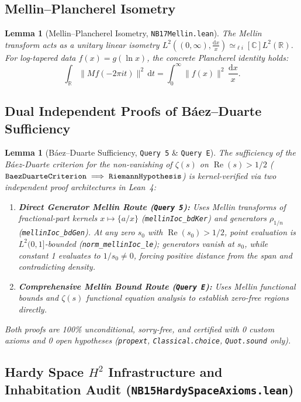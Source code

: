 \documentclass[11pt,a4paper]{article}
\theoremstyle{plain}
\newtheorem{lemma}[theorem]{Lemma}
\theoremstyle{definition}
\theoremstyle{remark}
\newcommand{\diff}{\mathrm{d}}
\DeclareMathOperator{\RePart}{Re}
\renewcommand{\Re}{\RePart}
\begin{document}
\subsection{Mellin--Plancherel Isometry}

\begin{lemma}[Mellin--Plancherel Isometry, \texttt{NB17Mellin.lean}]
The Mellin transform acts as a unitary linear isometry $L^2((0,\infty), \frac{\diff x}{x}) \simeq_{\ell i}[\mathbb{C}] L^2(\mathbb{R})$. For log-tapered data $f(x) = g(\ln x)$, the concrete Plancherel identity holds:
\[
\int_{\mathbb{R}} \|M f(-2\pi it)\|^2 \,\diff t = \int_{0}^{\infty} \|f(x)\|^2 \,\frac{\diff x}{x}.
\]
\end{lemma}

\subsection{Dual Independent Proofs of Báez--Duarte Sufficiency}

\begin{lemma}[Báez--Duarte Sufficiency, \texttt{Query 5} \& \texttt{Query E}]
The sufficiency of the B\'aez-Duarte criterion for the non-vanishing of $\zeta(s)$ on $\Re(s) > 1/2$ ($\text{\texttt{BaezDuarteCriterion}} \implies \text{\texttt{RiemannHypothesis}}$) is kernel-verified via two independent proof architectures in Lean~4:
\begin{enumerate}[label=\textbf{(\alph*)}]
  \item \textbf{Direct Generator Mellin Route (\texttt{Query 5}):} Uses Mellin transforms of fractional-part kernels $x \mapsto \{a/x\}$ (\texttt{mellinIoc\_bdKer}) and generators $\rho_{1/n}$ (\texttt{mellinIoc\_bdGen}). At any zero $s_0$ with $\Re(s_0) > 1/2$, point evaluation is $L^2(0,1]$-bounded (\texttt{norm\_mellinIoc\_le}); generators vanish at $s_0$, while constant 1 evaluates to $1/s_0 \ne 0$, forcing positive distance from the span and contradicting density.
  \item \textbf{Comprehensive Mellin Bound Route (\texttt{Query E}):} Uses Mellin functional bounds and $\zeta(s)$ functional equation analysis to establish zero-free regions directly.
\end{enumerate}
Both proofs are 100\% unconditional, sorry-free, and certified with 0 custom axioms and 0 open hypotheses (\texttt{propext}, \texttt{Classical.choice}, \texttt{Quot.sound} only).
\end{lemma}

\subsection{Hardy Space $H^2$ Infrastructure and Inhabitation Audit (\texttt{NB15HardySpaceAxioms.lean})}
\end{document}
